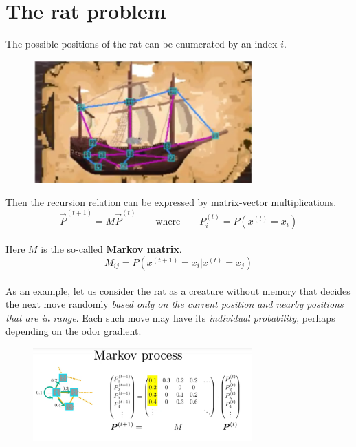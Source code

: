 \documentclass[12pt, a4paper]{scrartcl}
\begin{document}
\section*{The rat problem}
The possible positions of the rat can be enumerated by an index $i$. %
 \begin{figure}[H]
	\centering
	\includegraphics[width=0.75\textwidth]{5_8.png}
\end{figure}
Then the recursion relation can be expressed by matrix-vector multiplications. 
\begin{equation*}\boxed{\vec{P}^{(t+1)}=M\vec{P}^{(t)} \qquad \text{where} \qquad P_i^{(t)}=P(x^{(t)}=x_i)
}\end{equation*}\\
Here $M$ is the so-called \textbf{Markov matrix}.
\begin{equation*}\boxed{ M_{ij}=P(x^{(t+1)}=x_i|x^{(t)}=x_j)
}\end{equation*}\\

As an example, let us consider the rat as a creature without memory that decides the next move randomly \textit{based only on the current position and nearby positions that are in range}. Each such move may have its \textit{individual probability}, perhaps depending on the odor gradient. \\
 \begin{figure}[H]
	\centering
	\includegraphics[width=0.75\textwidth]{5_9.png}
\end{figure}
\end{document}
